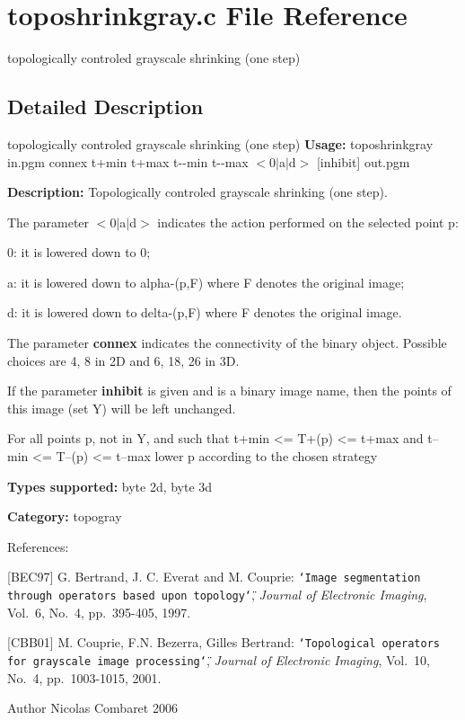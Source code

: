 \section{toposhrinkgray.c File Reference}
\label{toposhrinkgray_8c}


topologically controled grayscale shrinking (one step)  




\subsection{Detailed Description}
topologically controled grayscale shrinking (one step) {\bfseries Usage:} toposhrinkgray in.pgm connex t+min t+max t-\/-\/min t-\/-\/max $<$0$|$a$|$d$>$ [inhibit] out.pgm

{\bfseries Description:} Topologically controled grayscale shrinking (one step).

The parameter $<$0$|$a$|$d$>$ indicates the action performed on the selected point p: \begin{DoxyItemize}
\item 0: it is lowered down to 0; \item a: it is lowered down to alpha-\/(p,F) where F denotes the original image; \item d: it is lowered down to delta-\/(p,F) where F denotes the original image.\end{DoxyItemize}
The parameter {\bfseries connex} indicates the connectivity of the binary object. Possible choices are 4, 8 in 2D and 6, 18, 26 in 3D.

If the parameter {\bfseries inhibit} is given and is a binary image name, then the points of this image (set Y) will be left unchanged.

\begin{DoxyVerb}
  For all points p, not in Y, and such that 
      t+min <= T+(p) <= t+max and t--min <= T--(p) <= t--max 
    lower p according to the chosen strategy
\end{DoxyVerb}


{\bfseries Types supported:} byte 2d, byte 3d

{\bfseries Category:} topogray

References:

[BEC97] G. Bertrand, J. C. Everat and M. Couprie: {\tt \char`\"{}Image segmentation through operators based upon topology\char`\"{}}, {\itshape  Journal of Electronic Imaging\/}, Vol.~6, No.~4, pp.~395-\/405, 1997.

[CBB01] M. Couprie, F.N. Bezerra, Gilles Bertrand: {\tt \char`\"{}Topological operators for
grayscale image processing\char`\"{}}, {\itshape  Journal of Electronic Imaging\/}, Vol.~10, No.~4, pp.~1003-\/1015, 2001.

\begin{DoxyAuthor}{Author}
Nicolas Combaret 2006 
\end{DoxyAuthor}
